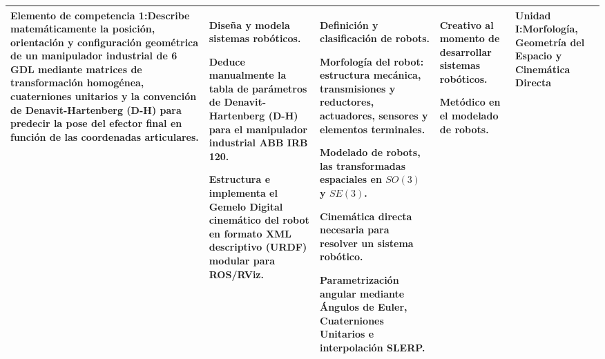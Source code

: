 \documentclass[11pt, letterpaper]{article}
\begin{document}
\begin{xltabular}{\textwidth}{|>{\raggedright\arraybackslash}p{3.5cm}|>{\raggedright\arraybackslash}X|>{\raggedright\arraybackslash}X|>{\raggedright\arraybackslash}X|>{\centering\arraybackslash}p{2.5cm}|}
\textbf{Elemento de competencia 1:}\newline Describe matemáticamente la posición, orientación y configuración geométrica de un manipulador industrial de 6 GDL mediante matrices de transformación homogénea, cuaterniones unitarios y la convención de Denavit-Hartenberg (D-H) para predecir la pose del efector final en función de las coordenadas articulares.
& \begin{tabitemize}
    \item Diseña y modela sistemas robóticos.
    \item Deduce manualmente la tabla de parámetros de Denavit-Hartenberg (D-H) para el manipulador industrial ABB IRB 120.
    \item Estructura e implementa el Gemelo Digital cinemático del robot en formato XML descriptivo (URDF) modular para ROS/RViz.
\end{tabitemize}
& \begin{tabitemize}
    \item Definición y clasificación de robots.
    \item Morfología del robot: estructura mecánica, transmisiones y reductores, actuadores, sensores y elementos terminales.
    \item Modelado de robots, las transformadas espaciales en $SO(3)$ y $SE(3)$.
    \item Cinemática directa necesaria para resolver un sistema robótico.
    \item Parametrización angular mediante Ángulos de Euler, Cuaterniones Unitarios e interpolación SLERP.
\end{tabitemize}
& \begin{tabitemize}
    \item Creativo al momento de desarrollar sistemas robóticos.
    \item Metódico en el modelado de robots.
\end{tabitemize}
& Unidad I:\newline Morfología, Geometría del Espacio y Cinemática Directa
\\ \hline


\end{xltabular}
\end{document}
